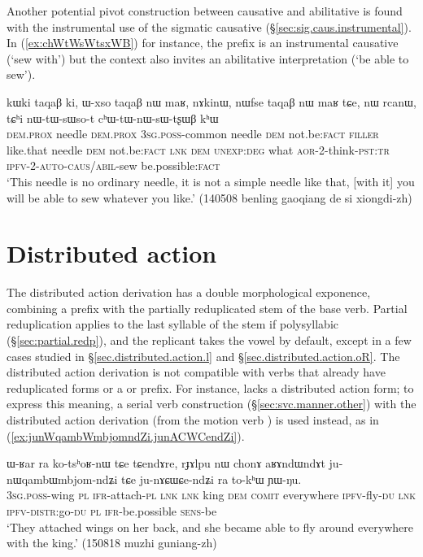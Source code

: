 Another potential pivot construction between causative and abilitative is found with the instrumental use of the sigmatic causative (§\ref{sec:sig.caus.instrumental}). In (\ref{ex:chWtWsWtsxWB}) for instance, the  prefix is an instrumental causative (`sew with') but the context also invites an abilitative interpretation (`be able to sew').

\begin{exe}
\ex \label{ex:chWtWsWtsxWB}
\gll  kɯki taqaβ ki, ɯ-xso taqaβ nɯ maʁ, nɤkinɯ, nɯfse taqaβ nɯ maʁ tɕe, nɯ rcanɯ, tɕʰi nɯ-tɯ-sɯso-t cʰɯ-tɯ-nɯ-sɯ-tʂɯβ kʰɯ  \\
\textsc{dem}.\textsc{prox} needle \textsc{dem}.\textsc{prox} \textsc{3sg}.\textsc{poss}-common needle \textsc{dem} not.be:\textsc{fact} \textsc{filler} like.that needle \textsc{dem} not.be:\textsc{fact} \textsc{lnk} \textsc{dem} \textsc{unexp}:\textsc{deg} what \textsc{aor}-2-think-\textsc{pst}:\textsc{tr} \textsc{ipfv}-2-\textsc{auto}-\textsc{caus/abil}-sew be.possible:\textsc{fact} \\
\glt `This needle is no ordinary needle, it is not a simple needle like that, [with it] you will be able to sew whatever you like.' (140508 benling gaoqiang de si xiongdi-zh)
\end{exe}
   
\section{Distributed action} \label{sec:distributed.action} 
The distributed action derivation has a double morphological exponence, combining a prefix  with the partially reduplicated stem of the base verb. Partial reduplication applies to the last syllable of the stem if polysyllabic (§\ref{sec:partial.redp}), and the replicant takes the vowel  by default, except in a few cases studied in §\ref{sec.distributed.action.l} and §\ref{sec.distributed.action.oR}. The distributed action derivation is not compatible with verbs that already have reduplicated forms or a  or  prefix. For instance,  lacks a distributed action form; to express this meaning, a serial verb construction (§\ref{sec:svc.manner.other}) with the distributed action derivation   (from the motion verb ) is used instead, as in (\ref{ex:junWqambWmbjomndZi.junACWCendZi}).

\begin{exe}
\ex \label{ex:junWqambWmbjomndZi.junACWCendZi}
\gll  ɯ-ʁar ra ko-tsʰoʁ-nɯ tɕe tɕendɤre, rɟɤlpu nɯ chonɤ aʁɤndɯndɤt ju-nɯqambɯmbjom-ndʑi tɕe ju-nɤɕɯɕe-ndʑi ra to-kʰɯ ɲɯ-ŋu. \\
\textsc{3sg}.\textsc{poss}-wing \textsc{pl} \textsc{ifr}-attach-\textsc{pl} \textsc{lnk} \textsc{lnk} king \textsc{dem} \textsc{comit} everywhere \textsc{ipfv}-fly-\textsc{du} \textsc{lnk} \textsc{ipfv}-\textsc{distr}:go-\textsc{du} \textsc{pl} \textsc{ifr}-be.possible \textsc{sens}-be \\
\glt `They attached wings on her back, and she became able to fly around everywhere with the king.' (150818 muzhi guniang-zh)
\end{exe}

